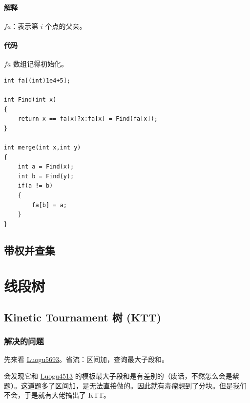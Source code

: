 \documentclass[10pt,twoside,a4paper,UTF8]{ctexbook}
\begin{document}
	\subsubsection{解释}
	$fa$：表示第 $i$ 个点的父亲。
	\subsubsection{代码}
	$fa$ 数组记得初始化。
	\begin{lstlisting}
int fa[(int)1e4+5];

int Find(int x)
{
	return x == fa[x]?x:fa[x] = Find(fa[x]);
}

int merge(int x,int y)
{
	int a = Find(x);
	int b = Find(y);
	if(a != b)
	{
		fa[b] = a;
	}
}
	\end{lstlisting}
	\section{带权并查集}
	
	\chapter{线段树}
	\section{Kinetic Tournament 树 (KTT)}
	\subsection{解决的问题}
	先来看 \href{https://www.luogu.com.cn/problem/P5693}{Luogu5693}。省流：区间加，查询最大子段和。\par
	会发现它和 \href{https://www.luogu.com.cn/problem/P4513}{Luogu4513} 的模板最大子段和是有差别的（废话，不然怎么会是紫题）。这道题多了区间加，是无法直接做的。因此就有毒瘤想到了分块。但是我们不会，于是就有大佬搞出了 KTT。\par
\end{document}
